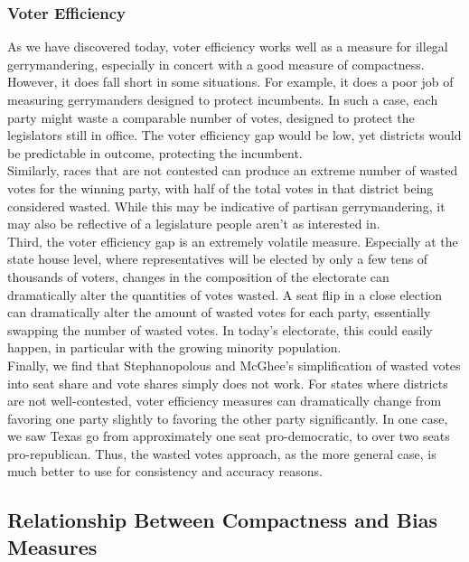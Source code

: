 \documentclass[12pt]{article}
\begin{document}
  \subsubsection{Voter Efficiency}
  As we have discovered today, voter efficiency works well as a measure for illegal gerrymandering, especially in concert with a good measure of compactness.  However, it does fall short in some situations.  For example, it does a poor job of measuring gerrymanders designed to protect incumbents.  In such a case, each party might waste a comparable number of votes, designed to protect the legislators still in office.  The voter efficiency gap would be low, yet districts would be predictable in outcome, protecting the incumbent.\\
  
  Similarly, races that are not contested can produce an extreme number of wasted votes for the winning party, with half of the total votes in that district being considered wasted.  While this may be indicative of partisan gerrymandering, it may also be reflective of a legislature people aren't as interested in.\\
  
  Third, the voter efficiency gap is an extremely volatile measure.  Especially at the state house level, where representatives will be elected by only a few tens of thousands of voters, changes in the composition of the electorate can dramatically alter the quantities of votes wasted.  A seat flip in a close election can dramatically alter the amount of wasted votes for each party, essentially swapping the number of wasted votes.  In today's electorate, this could easily happen, in particular with the growing minority population.\\
  
  Finally, we find that Stephanopolous and McGhee's simplification of wasted votes into seat share and vote shares simply does not work.  For states where districts are not well-contested, voter efficiency measures can dramatically change from favoring one party slightly to favoring the other party significantly.  In one case, we saw Texas go from approximately one seat pro-democratic, to over two seats pro-republican.  Thus, the wasted votes approach, as the more general case, is much better to use for consistency and accuracy reasons.
  
  \subsection{Relationship Between Compactness and Bias Measures}
\end{document}

